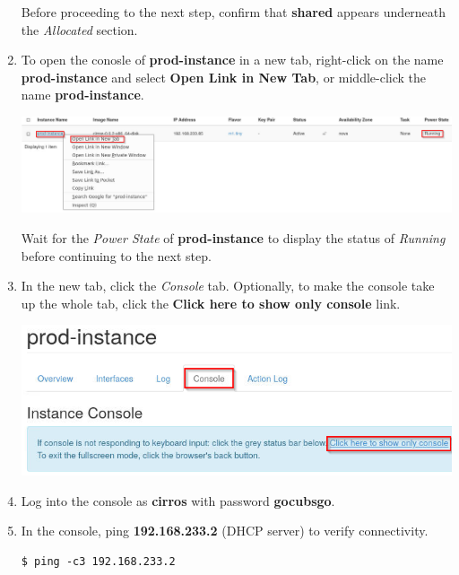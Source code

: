\documentclass[letterpaper, 12pt]{article}
\begin{document}
\begin{enumerate}
    \begin{stopbox}{}
        Before proceeding to the next step, confirm that \textbf{shared} appears underneath the \textit{Allocated}
        section.
    \end{stopbox}

    \item To open the conosle of \textbf{prod-instance} in a new tab, right-click on the name \textbf{prod-instance} and
    select \textbf{Open Link in New Tab}, or middle-click the name \textbf{prod-instance}.

    \begin{center}
        \includegraphics[width=\linewidth]{images/part1/step14.png}
    \end{center}

    \begin{stopbox}{}
        Wait for the \textit{Power State} of \textbf{prod-instance} to display the status of \textit{Running} before
        continuing to the next step.
    \end{stopbox}

    \item In the new tab, click the \textit{Console} tab. Optionally, to make the console take up the whole tab, click
    the \textbf{Click here to show only console} link.
    
    \begin{center}
        \includegraphics[width=\linewidth]{images/part1/step16.png}
    \end{center}

    \item Log into the console as \textbf{cirros} with password \textbf{gocubsgo}.

    \item In the console, ping \textbf{192.168.233.2} (DHCP server) to verify connectivity.
\begin{lstlisting}
$ ping -c3 192.168.233.2
\end{lstlisting}


\end{enumerate}
\end{document}
